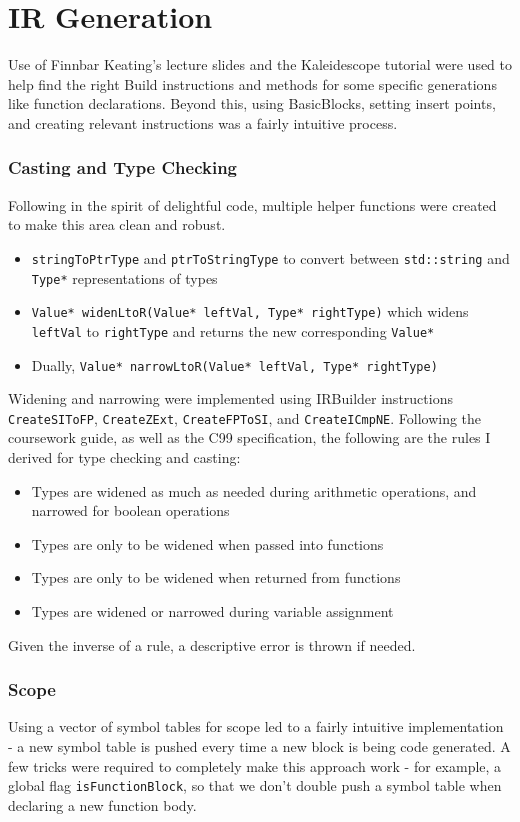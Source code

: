 \documentclass[10pt,a4paper]{article}
\newcommand{\code}[1]{\lstinline!#1!}
\begin{document}
\section*{IR Generation}
Use of Finnbar Keating's lecture slides and the Kaleidescope tutorial were used to help find the right Build instructions and methods for some specific generations like function declarations. Beyond this, using BasicBlocks, setting insert points, and creating relevant instructions was a fairly intuitive process.
\subsubsection*{Casting and Type Checking}
Following in the spirit of delightful code, multiple helper functions were created to make this area clean and robust. 
\begin{itemize}
    \item \code{stringToPtrType} and \code{ptrToStringType} to convert between \code{std::string} and \code{Type*} representations of types
    \item \code{Value* widenLtoR(Value* leftVal, Type* rightType)} which widens \code{leftVal} to \code{rightType} and returns the new corresponding \code{Value*}
    \item Dually, \code{Value* narrowLtoR(Value* leftVal, Type* rightType)}
\end{itemize}
Widening and narrowing were implemented using IRBuilder instructions \code{CreateSIToFP}, \code{CreateZExt}, \code{CreateFPToSI}, and \code{CreateICmpNE}. Following the coursework guide, as well as the C99 specification, the following are the rules I derived for type checking and casting:
\begin{itemize}
    \item Types are widened as much as needed during arithmetic operations, and narrowed for boolean operations
    \item Types are only to be widened when passed into functions
    \item Types are only to be widened when returned from functions
    \item Types are widened or narrowed during variable assignment
\end{itemize}
Given the inverse of a rule, a descriptive error is thrown if needed.
\subsubsection*{Scope}
Using a vector of symbol tables for scope led to a fairly intuitive implementation - a new symbol table is pushed every time a new block is being code generated. A few tricks were required to completely make this approach work - for example, a global flag \code{isFunctionBlock}, so that we don't double push a symbol table when declaring a new function body.
\end{document}
